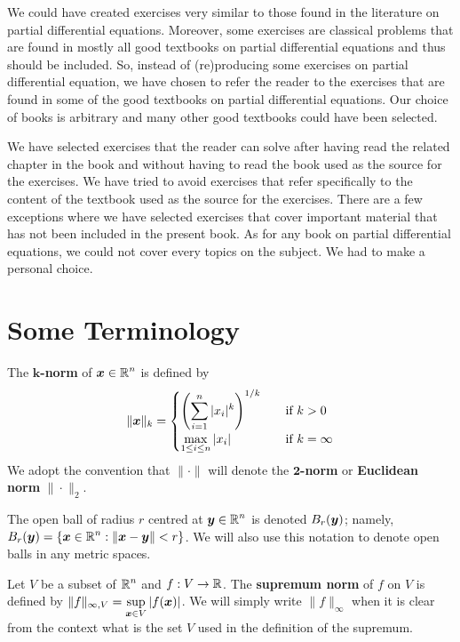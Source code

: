 We could have created exercises very similar to those found in the
literature on partial differential equations.  Moreover, some
exercises are classical problems that are found in mostly all good textbooks on
partial differential equations and thus should be included.  So, instead of
(re)producing some exercises on partial differential equation, we have
chosen to refer the reader to the exercises that are found in some of
the good textbooks on partial differential equations.  Our choice of
books is arbitrary and many other good textbooks could have been selected.

We have selected exercises that the reader can solve after having read
the related chapter in the book and without having to read the book
used as the source for the exercises.  We have tried to avoid exercises
that refer specifically to the content of the textbook used as the
source for the exercises.  There are a few exceptions where
we have selected exercises that cover important material that has not
been included in the present book.  As for any book on partial
differential equations, we could not cover every topics on the
subject.  We had to make a personal choice.

\section*{Some Terminology}

The {\bfseries $\mathbf{k}$-norm} of
$\displaystyle {\bm{x}} \in \mathbb{R}^n$ is defined by
\[
\|{\bm{x}}\|_k =
\begin{cases}
\displaystyle \left(\sum_{i=1}^n |x_i|^k\right)^{1/k} & \quad \text{if}\ k > 0 \\
\displaystyle \max_{1\leq i \leq n} |x_i| & \quad \text{if} \ k = \infty  
\end{cases}
\]
We adopt the convention that $\|\cdot\|$ will denote the
{\bfseries $\mathbf{2}$-norm} or
{\bfseries Euclidean norm} $\|\cdot\|_2$.

The open ball of radius $r$ centred at $\displaystyle {\bm{y}} \in \mathbb{R}^n$
is denoted $\displaystyle B_r({\bm{y}})$; namely,\\
$\displaystyle B_r({\bm{y}}) = \left\{ {\bm{x}} \in \mathbb{R}^n :
\left\|{\bm{x}}-{\bm{y}} \right\| < r \right\}$.  We will also use this
notation to denote open balls in any metric spaces.

Let $V$ be a subset of $\displaystyle \mathbb{R}^n$ and $f:V \to \mathbb{R}$.  The
{\bfseries supremum norm}
of $f$ on $V$ is defined by
$\displaystyle \|f\|_{\infty,V} = \sup_{{\bm{x}}\in V} |f({\bm{x}})|$.
We will simply write $\|f\|_\infty$ when it is clear from the context
what is the set $V$ used in the definition of the supremum.

